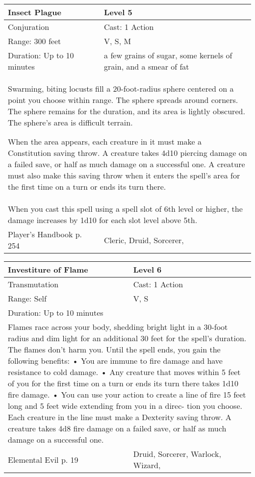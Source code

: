 \documentclass[11pt]{report}
\begin{document}
\begin{table}[H]
	\begin{tabular}{||p{6cm}|p{6cm}||}
		\hline\hline
		\bf{Insect Plague} & Level 5\\ \hline
		Conjuration & Cast: 1 Action\\ \hline
		Range: 300 feet & V, S, M\\ \hline
		Duration: Up to 10 minutes & a few grains of sugar, some kernels of grain, and a smear of fat\\ \hline
		\multicolumn{2}{||p{12cm}||}{Swarming, biting locusts fill a 20-foot-radius sphere centered on a point you choose within range. The sphere spreads around corners. The sphere remains for the duration, and its area is lightly obscured. The sphere’s area is difficult terrain.

When the area appears, each creature in it must make a Constitution saving throw. A creature takes 4d10 piercing damage on a failed save, or half as much damage on a successful one. A creature must also make this saving throw when it enters the spell’s area for the first time on a turn or ends its turn there.}\\ \hline
		\multicolumn{2}{||p{12cm}||}{When you cast this spell using a spell slot of 6th level or higher, the damage increases by 1d10 for each slot level above 5th.}\\ \hline
Player's Handbook p. 254 & Cleric, Druid, Sorcerer, \\ \hline\hline
	\end{tabular}
\end{table}

\begin{table}[H]
	\begin{tabular}{||p{6cm}|p{6cm}||}
		\hline\hline
		\bf{Investiture of Flame} & Level 6\\ \hline
		Transmutation & Cast: 1 Action\\ \hline
		Range: Self & V, S\\ \hline
		Duration: Up to 10 minutes & \\ \hline
		\multicolumn{2}{||p{12cm}||}{Flames race across your body, shedding bright light in a 30-foot radius and dim light for an additional 30 feet for the spell’s duration. The flames don’t harm you. Until the spell ends, you gain the following benefits:
• You are immune to fire damage and have resistance to cold damage.
• Any creature that moves within 5 feet of you for the first time on a turn or ends its turn there takes 1d10 fire damage.
• You can use your action to create a line of fire 15 feet long and 5 feet wide extending from you in a direc- tion you choose. Each creature in the line must make a Dexterity saving throw. A creature takes 4d8 fire damage on a failed save, or half as much damage on a successful one.}\\ \hline
Elemental Evil p. 19 & Druid, Sorcerer, Warlock, Wizard, \\ \hline\hline
	\end{tabular}
\end{table}
\end{document}
